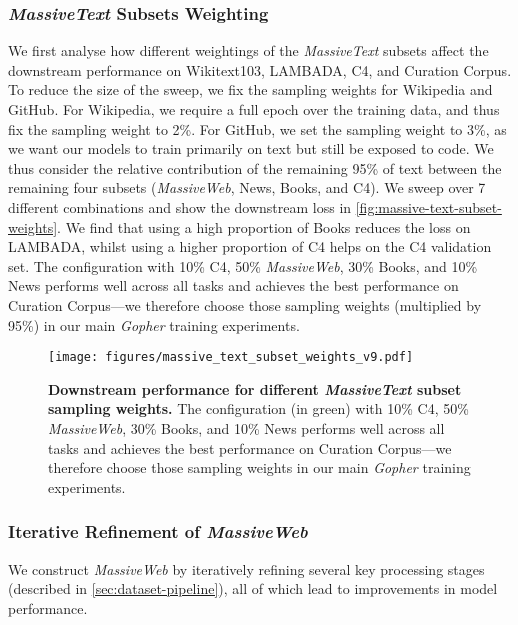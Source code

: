 \documentclass[11pt, a4paper, logo, internal, copyright, nonumbering]{deepmind}
\newcommand{\massivetext}{\textit{MassiveText}\xspace}
\newcommand{\massiveweb}{\textit{MassiveWeb}\xspace}
\newcommand{\gopher}{\textit{Gopher}\xspace}
\begin{document}
\subsubsection{\massivetext Subsets Weighting}
\label{app:dataset_subset_weightings}
We first analyse how different weightings of the \massivetext subsets affect the downstream performance on Wikitext103, LAMBADA, C4, and Curation Corpus.
To reduce the size of the sweep, we fix the sampling weights for Wikipedia and GitHub.
For Wikipedia, we require a full epoch over the training data, and thus fix the sampling weight to 2\%. 
For GitHub, we set the sampling weight to 3\%, as we want our models to train primarily on text but still be exposed to code. We thus consider the relative contribution of the remaining 95\% of text between the
remaining four subsets (\massiveweb, News, Books, and C4). We sweep over 7 different combinations and show the downstream loss in \autoref{fig:massive-text-subset-weights}.
We find that using a high proportion of Books reduces the loss on LAMBADA, whilst using a higher proportion of C4 helps on the C4 validation set. 
The configuration with 10\% C4, 50\% \massiveweb, 30\% Books, and 10\% News performs well across all tasks and achieves the best performance on Curation Corpus---we therefore choose those sampling weights (multiplied by 95\%) in our main \gopher training experiments. 
\begin{figure}[h]
    \centering
    \texttt{[image: figures/massive\_text\_subset\_weights\_v9.pdf]}
    \caption{\textbf{Downstream performance for different \massivetext subset sampling weights.} The configuration (in green) with 10\% C4, 50\% \massiveweb, 30\% Books, and 10\% News performs well across all tasks and achieves the best performance on Curation Corpus---we therefore choose those sampling weights in our main \gopher training experiments.}
    \label{fig:massive-text-subset-weights}
\end{figure}

\subsubsection{Iterative Refinement of \massiveweb}
\label{sec:massiveweb_ablations}
We construct \massiveweb by iteratively refining several key processing stages (described in \autoref{sec:dataset-pipeline}), all of which lead to improvements in model performance.
\end{document}
